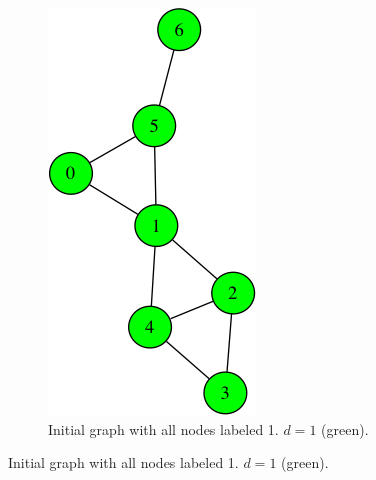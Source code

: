 \begin{figure}
\centering

\begin{subfigure}{0.20\textwidth}
\includegraphics[width=\linewidth]{images/coloring/0.png}
\caption{Initial graph with all nodes labeled 1. $d=1$ (green).\\} \label{fig:coloring0}

\end{subfigure}
\end{figure}
